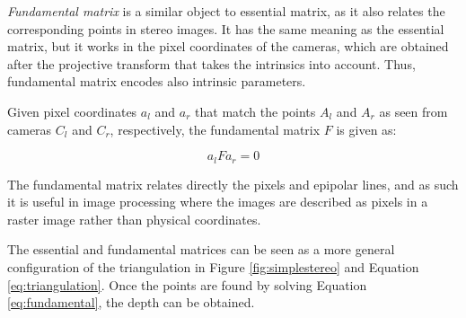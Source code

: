 
\emph{Fundamental matrix} \cite[ch. 11]{hartley03multiview} is a similar object to essential matrix, as it also relates the corresponding points in stereo images.
It has the same meaning as the essential matrix, but it works in the pixel coordinates of the cameras, which are obtained after the projective transform that takes the intrinsics into account.
Thus, fundamental matrix encodes also intrinsic parameters.

Given pixel coordinates $a_l$ and $a_r$ that match the points $A_l$ and $A_r$ as seen from cameras $C_l$ and $C_r$, respectively, the fundamental matrix $F$ is given as:

\begin{equation} \label{eq:fundamental}
	a_l F a_r = 0
\end{equation}


%
%
%
%

The fundamental matrix relates directly the pixels and epipolar lines, and as such it is useful in image processing where the images are described as pixels in a raster image rather than physical coordinates.

The essential and fundamental matrices can be seen as a more general configuration of the triangulation in Figure \ref{fig:simplestereo} and Equation \ref{eq:triangulation}.
Once the points are found by solving Equation \ref{eq:fundamental}, the depth can be obtained.
\cite{hartley03multiview}



